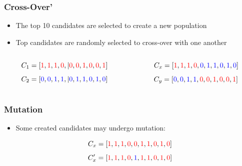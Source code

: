 \documentclass{beamer}
\begin{document}
\begin{frame}
  \frametitle{Cross-Over'}
\begin{itemize}
\item The top 10 candidates are selected to create a new population
\item Top candidates are randomly selected to cross-over with one another
\end{itemize}

  \begin{columns}
  \begin{column}{0.5\textwidth}

\[
C_1=[ \textcolor{red}{1},  \textcolor{red}{1}, \textcolor{red}{1},  \textcolor{red}{0},|  \textcolor{red}{0},  \textcolor{red}{0}, \textcolor{red}{1}, \textcolor{red}{0}, \textcolor{red}{0}, \textcolor{red}{1} ]
\]
\[C_2=[  \textcolor{blue}{0}, \textcolor{blue}{0}, \textcolor{blue}{1}, \textcolor{blue}{1},| \textcolor{blue}{0}, \textcolor{blue}{1}, \textcolor{blue}{1}, \textcolor{blue}{0}, \textcolor{blue}{1}, \textcolor{blue}{0} ]
\]
\end{column}
 \begin{column}{0.5\textwidth}

   \[
C_x=[ \textcolor{red}{1},  \textcolor{red}{1}, \textcolor{red}{1},  \textcolor{red}{0}, \textcolor{blue}{0}, \textcolor{blue}{1}, \textcolor{blue}{1}, \textcolor{blue}{0}, \textcolor{blue}{1}, \textcolor{blue}{0} ]
\]
\[C_y = [  \textcolor{blue}{0}, \textcolor{blue}{0}, \textcolor{blue}{1}, \textcolor{blue}{1}, \textcolor{red}{0},  \textcolor{red}{0}, \textcolor{red}{1}, \textcolor{red}{0}, \textcolor{red}{0}, \textcolor{red}{1} ]
\]
  \end{column}
  \end{columns}
\end{frame}

\begin{frame}
  \frametitle{Mutation}
\begin{itemize}
  \item Some created candidates may undergo mutation:
\end{itemize}
\[
C_x=[ \textcolor{red}{1},  \textcolor{red}{1}, \textcolor{red}{1},  \textcolor{red}{0}, \textcolor{red}{0}, \textcolor{red}{1}, \textcolor{red}{1}, \textcolor{red}{0}, \textcolor{red}{1}, \textcolor{red}{0} ]
\]
\[C_x'=[ \textcolor{red}{1},  \textcolor{red}{1}, \textcolor{red}{1},  \textcolor{red}{0}, \textcolor{blue}{1}, \textcolor{red}{1}, \textcolor{red}{1}, \textcolor{red}{0}, \textcolor{red}{1}, \textcolor{red}{0} ]
\]
\end{frame}
\end{document}
